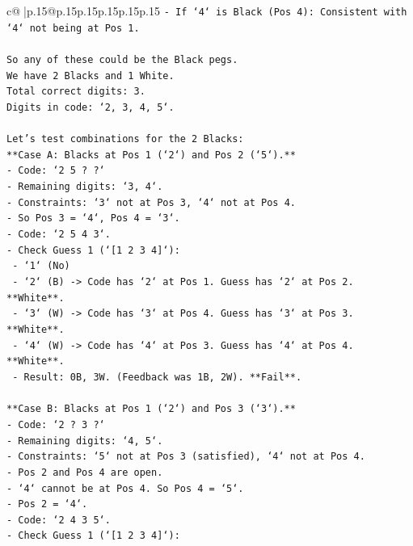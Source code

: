 \documentclass{article}
\begin{document}
{\begin{supertabular}{c@{$\;$}|p{.15\linewidth}@{}p{.15\linewidth}p{.15\linewidth}p{.15\linewidth}p{.15\linewidth}p{.15\linewidth}}
{{{\texttt{{-}   If `4` is Black (Pos 4): Consistent with `4` not being at Pos 1.} \\
\\ 
\texttt{So any of these could be the Black pegs.} \\
\texttt{We have 2 Blacks and 1 White.} \\
\texttt{Total correct digits: 3.} \\
\texttt{Digits in code: `2, 3, 4, 5`.} \\
\\ 
\texttt{Let's test combinations for the 2 Blacks:} \\
\texttt{**Case A: Blacks at Pos 1 (`2`) and Pos 2 (`5`).**} \\
\texttt{{-}   Code: `2 5 ? ?`} \\
\texttt{{-}   Remaining digits: `3, 4`.} \\
\texttt{{-}   Constraints: `3` not at Pos 3, `4` not at Pos 4.} \\
\texttt{{-}   So Pos 3 = `4`, Pos 4 = `3`.} \\
\texttt{{-}   Code: `2 5 4 3`.} \\
\texttt{{-}   Check Guess 1 (`{[}1 2 3 4{]}`):} \\
\texttt{    {-}   `1` (No)} \\
\texttt{    {-}   `2` (B) {-}> Code has `2` at Pos 1. Guess has `2` at Pos 2. **White**.} \\
\texttt{    {-}   `3` (W) {-}> Code has `3` at Pos 4. Guess has `3` at Pos 3. **White**.} \\
\texttt{    {-}   `4` (W) {-}> Code has `4` at Pos 3. Guess has `4` at Pos 4. **White**.} \\
\texttt{    {-}   Result: 0B, 3W. (Feedback was 1B, 2W). **Fail**.} \\
\\ 
\texttt{**Case B: Blacks at Pos 1 (`2`) and Pos 3 (`3`).**} \\
\texttt{{-}   Code: `2 ? 3 ?`} \\
\texttt{{-}   Remaining digits: `4, 5`.} \\
\texttt{{-}   Constraints: `5` not at Pos 3 (satisfied), `4` not at Pos 4.} \\
\texttt{{-}   Pos 2 and Pos 4 are open.} \\
\texttt{{-}   `4` cannot be at Pos 4. So Pos 4 = `5`.} \\
\texttt{{-}   Pos 2 = `4`.} \\
\texttt{{-}   Code: `2 4 3 5`.} \\
\texttt{{-}   Check Guess 1 (`{[}1 2 3 4{]}`):} \\
}}}
\end{supertabular}}
\end{document}
